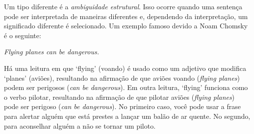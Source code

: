 Um tipo diferente é a \emph{ambiguidade estrutural}. Isso ocorre quando uma sentença pode ser interpretada de maneiras diferentes e, dependendo da interpretação, um significado diferente é selecionado. Um exemplo famoso devido a Noam Chomsky é o seguinte:
\begin{earg}
\item[] \textit{Flying planes can be dangerous.}
\end {earg}
Há uma leitura em que `flying' (voando) é usado como um adjetivo que modifica `planes' (aviões), resultando na afirmação de que aviões voando (\textit{flying planes}) podem ser perigosos (\textit{can be dangerous}). Em outra leitura, `flying' funciona como o verbo pilotar, resultando na afirmação de que pilotar aviões (\textit{flying planes}) pode ser perigoso (\textit{can be dangerous}). No primeiro caso, você pode usar a frase para alertar alguém que está prestes a lançar um balão de ar quente. No segundo, para aconselhar alguém a não se tornar um piloto. 

